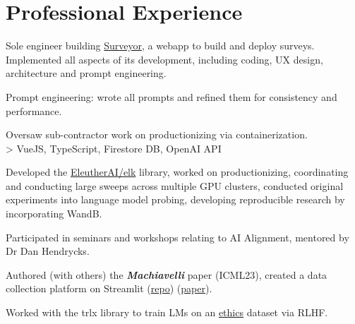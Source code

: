 \documentclass[]{deedy-resume-openfont}
\begin{document}
\begin{minipage}[t]{0.70\textwidth} 


\section{Professional Experience}

\vspace{\topsep} %
\begin{tightemize} 
\item Sole engineer building \href{https://surveyor.ink/}{Surveyor}, a webapp to build and deploy surveys. Implemented all aspects of its development, including coding, UX design, architecture and prompt engineering.
\item Prompt engineering: wrote all prompts and refined them for consistency and performance. 
\item Oversaw sub-contractor work on productionizing via containerization. \\> VueJS, TypeScript, Firestore DB, OpenAI API
\end{tightemize}
\sectionsep

\vspace{\topsep} %
\begin{tightemize}
\item Developed the \href{https://github.com/EleutherAI/elk}{EleutherAI/elk} library, worked on productionizing, coordinating and conducting large sweeps across multiple GPU clusters, conducted original experiments into language model probing, developing reproducible research by incorporating WandB.
\end{tightemize}
\sectionsep

\vspace{\topsep} %
\begin{tightemize}
\item Participated in seminars and workshops relating to AI Alignment, mentored by Dr Dan Hendrycks.
\item Authored (with others) the \emph{\textbf{Machiavelli}}
paper (ICML23), created a data collection platform on Streamlit (\href{https://github.com/derpyplops/cyoa-streamlit}{repo})
(\href{https://arxiv.org/abs/2304.03279}{paper}).
\item Worked with the trlx library to train LMs on an \href{https://github.com/hendrycks/ethics}{ethics} dataset via RLHF.


\end{tightemize}
\end{minipage}
\end{document}
